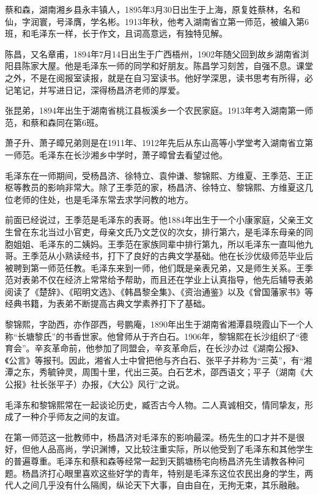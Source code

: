 \documentclass[../../dazhuan.tex]{subfiles}
\begin{document}
蔡和森，湖南湘乡县永丰镇人，1895年3月30日出生于上海，原复姓蔡林，名和仙，字润寰，号泽膺，学名彬。1913年秋，他考入湖南省立第一师范，被编入第6班，和毛泽东一样，长于作文，且词高意远，有独特见解。

陈昌，又名章甫，1894年7月14日出生于广西梧州，1902年随父回到故乡湖南省浏阳县陈家大屋。他是毛泽东一师的同学和好朋友。陈昌学习刻苦，自强不息。课堂之外，不是在阅报室读报，就是在自习室读书。他好学深思，读书思考有所得，必记笔记，并写进日记，深得杨昌济老师的厚爱。

张昆弟，1894年出生于湖南省桃江县板溪乡一个农民家庭。1913年考入湖南第一师范，和蔡和森同在第6班。

萧子升、萧子暲兄弟则是在1911年、1912年先后从东山高等小学堂考入湖南省立第一师范。毛泽东在长沙湘乡中学时，萧子暲曾去看望过他。

毛泽东在一师期间，受杨昌济、徐特立、袁仲谦、黎锦熙、方维夏、王季范、王正枢等教员的影响非常大。除了王季范的家，杨昌济、徐特立、黎锦熙、方维夏这几位老师的住处，也是毛泽东常去求学问教的地方。

前面已经说过，王季范是毛泽东的表哥。他1884年出生于一个小康家庭，父亲王文生曾在东北当过小官吏，母亲文氏乃文芝仪的次女，排行第六，是毛泽东母亲的同胞姐姐、毛泽东的二姨妈。王季范在家族同辈中排行第九，所以毛泽东一直叫他九哥。王季范从小熟读经书，打下了良好的古典文学基础。他在长沙优级师范毕业后被聘到第一师范任教。毛泽东来到一师，他们既是亲表兄弟，又是师生关系。王季范对表弟不仅在经济上常常给予帮助，而且还在学业上认真指导，他先后辅导表弟阅读了《楚辞》、《昭明文选》、《韩昌黎全集》、《资治通鉴》以及《曾国藩家书》等经典书籍，为表弟不断提高古典文学素养打下了基础。

黎锦熙，字劭西，亦作邵西，号鹏庵，1890年出生于湖南省湘潭县晓霞山下一个人称“长塘黎氏”的书香世家。他曾师从于齐白石。1906年，黎锦熙在长沙组织了“德育会”。辛亥革命前，他参加了同盟会，辛亥革命后，在长沙办过《湖南公报》、《公言》等报刊。因此，湘省人士中曾把他与齐白石、张平子并称为“三英”，有“湘潭之东，秀毓钟灵，周围十里，代出三英。白石艺术，邵西语文；平子（湖南《大公报》社长张平子）办报，《大公》风行”之说。

毛泽东和黎锦熙常在一起谈论历史，臧否古今人物。二人真诚相交，情同挚友，形成了一种介乎师友之间的友谊。

在第一师范这一批教师中，杨昌济对毛泽东的影响最深。杨先生的口才并不是很好，但他人品高尚，学识渊博，又比较注重实际，所以他受到了毛泽东和其他学生的普遍尊重。毛泽东和蔡和森等经常一起到天鹅塘杨宅向杨昌济先生请教各种问题。杨昌济打心眼里喜欢这些好学的青年，特别是毛泽东这位农民出身的学生，两代人之间几乎没有什么隔阂，纵论天下大事，自由自在，无拘无束，其乐融融。
\end{document}
